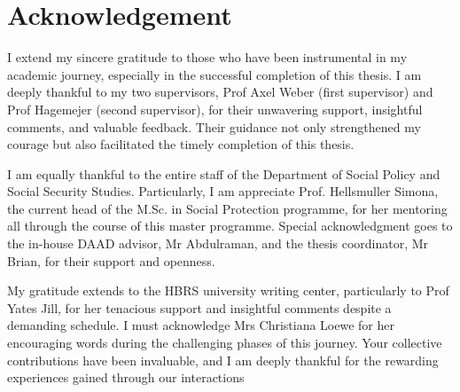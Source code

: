 \section*{\centering Acknowledgement}

I extend my sincere gratitude to those who have been instrumental in my academic journey, especially in the successful completion of this thesis. I am deeply thankful to my two supervisors, Prof Axel Weber (first supervisor) and Prof Hagemejer (second supervisor), for their unwavering support, insightful comments, and valuable feedback. Their guidance not only strengthened my courage but also facilitated the timely completion of this thesis. 


I am equally thankful to the entire staff of the Department of Social Policy and Social Security Studies. Particularly, I am appreciate Prof. Hellsmuller Simona, the current head of the M.Sc. in Social Protection programme, for her mentoring all through the course of this master programme. Special acknowledgment goes to the in-house DAAD advisor, Mr Abdulraman, and the thesis coordinator, Mr Brian, for their support and openness.

 

My gratitude extends to the HBRS university writing center, particularly to Prof Yates Jill, for her tenacious support and insightful comments despite a demanding schedule. I must acknowledge Mrs Christiana Loewe for her encouraging words during the challenging phases of this journey. Your collective contributions have been invaluable, and I am deeply thankful for the rewarding experiences gained through our interactions   
